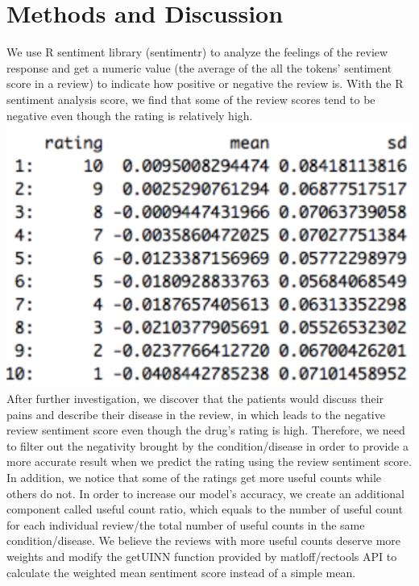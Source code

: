 \documentclass{article}
\begin{document}
\section{Methods and Discussion}
We use R sentiment library (sentimentr) to analyze the feelings of the 
review response and get a numeric value (the average of the all the tokens’ 
sentiment score in a review) to indicate how positive or negative the 
review is. With the R sentiment analysis score, we find that some of the 
review scores tend to be negative even though the rating is relatively 
high. 
\newline
\includegraphics[scale=0.5]{method_and_dicussion_table1.png}
\newline
After further investigation, we discover that the patients
would discuss their pains and describe their disease in the review, in 
which leads to the negative review sentiment score even though the drug’s 
rating is high. Therefore, we need to filter out the negativity brought 
by the condition/disease in order to provide a more accurate result when 
we predict the rating using the review sentiment score. \newline \newline In addition, we notice that some of the ratings get more useful counts 
while others do not. In order to increase our model’s accuracy, we create 
an additional component called useful count ratio, which equals to the 
number of useful count for each individual review/the total number of 
useful counts in the same condition/disease. We believe the reviews 
with more useful counts deserve more weights and modify the getUINN 
function provided by matloff/rectools API to calculate the weighted mean 
sentiment score instead of a simple mean. 
\end{document}
